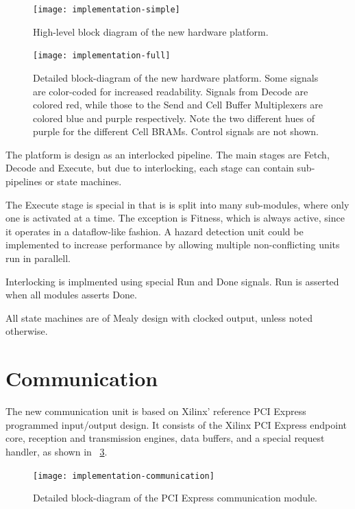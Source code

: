 \begin{figure}[!ht]
    \centering
    \texttt{[image: implementation-simple]}
    \caption{High-level block diagram of the new hardware platform.}
    \label{fig:implementation-simple}
\end{figure}

\begin{figure}[!ht]
    \hspace{-0.1\textwidth}
    \texttt{[image: implementation-full]}
    \caption{
        Detailed block-diagram of the new hardware platform.
        Some signals are color-coded for increased readability.
        Signals from Decode are colored red, while those to the Send and Cell Buffer Multiplexers are colored blue and purple respectively.
        Note the two different hues of purple for the different Cell BRAMs.
        Control signals are not shown.
    }
    \label{fig:implementation-full}
\end{figure}

The platform is design as an interlocked pipeline.
The main stages are Fetch, Decode and Execute, but due to interlocking, each stage can contain sub-pipelines or state machines.

The Execute stage is special in that is is split into many sub-modules, where only one is activated at a time.
The exception is Fitness, which is always active, since it operates in a dataflow-like fashion.
A hazard detection unit could be implemented to increase performance by allowing multiple non-conflicting units run in parallell.

Interlocking is implmented using special Run and Done signals.
Run is asserted when all modules asserts Done.

All state machines are of Mealy design with clocked output, unless noted otherwise.

\section{Communication}

The new communication unit is based on Xilinx' reference PCI Express programmed input/output design.
It consists of the Xilinx PCI Express endpoint core, reception and transmission engines, data buffers, and a special request handler, as shown in \figurename~\ref{fig:implementation-communication}.

\begin{figure}[!ht]
    \centering
    \texttt{[image: implementation-communication]}
    \caption{Detailed block-diagram of the PCI Express communication module.}
    \label{fig:implementation-communication}
\end{figure}


